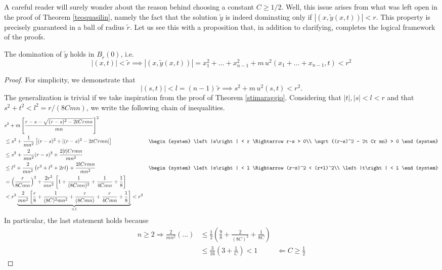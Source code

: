 A careful reader will surely wonder about the reason behind choosing a constant $C\geq 1/2$. Well, this issue arises from what was left open in the proof of Theorem \ref{teoquasilin}, namely the fact that the solution $\widetilde{y}$ is indeed dominating only if $|(x,\widetilde{y}(x,t))|< r$. This property is precisely guaranteed in a ball of radius $\widetilde{r}$. Let us see this with a proposition that, in addition to clarifying, completes the logical framework of the proofs.
\begin{namedtheorem}[Proposition]\label{prop}
The domination of $\widetilde{y}$ holds in $B_{\widetilde{r}}(0)$, i.e.
$$|(x,t)|<\widetilde{r} \implies |(x,\widetilde{y}(x,t))|=x_1^2 + \ldots + x_{n-1}^2 + m \, u^2(x_1 + \ldots + x_{n-1},t) < r^2$$
\end{namedtheorem}
\begin{proof}
For simplicity, we demonstrate that $$|(s,t)|< l=(n-1)\,\widetilde{r} \implies s^2 + m \, u^2(s,t) < r^2.$$ The generalization is trivial if we take inspiration from the proof of Theorem \ref{stimaraggio}. 
\newpage
Considering that $|t|,|s|<l<r$ and that $s^2+t^2<l^2=r/(8Cmn)$, we write the following chain of inequalities.
\begin{align*}
& s^2 + m \left[ \frac{r-s-\sqrt{(r-s)^2-2tCrmn}}{mn} \right]^2\\ 
&\leq s^2 + \frac{1}{mn^2} \left[ (r-s)^2 + |(r-s)^2-2tCrmn| \right] 
&\begin{system}
\left|s\right| < r \Rightarrow r-s > 0\\
 \sqrt{(r-s)^2 - 2t Cr mn} > 0 
\end{system}\\
&\leq s^2 + \frac{2}{mn^2} (r-s)^2 + \frac{2|t|Crmn}{mn^2} \\ 
&\leq l^2 + \frac{2}{mn^2} \left( r^2 + l^2 + 2rl \right) + \frac{2lCrmn}{mn^2} 
&\begin{system}
\left|s\right| < l \Rightarrow (r-s)^2 < (r+l)^2\\
\left|t\right| < l
\end{system}\\
&= \left( \frac{r}{8Cmn} \right)^2 + \frac{2r^2}{mn^2} \left[ 1+\frac{1}{(8Cmn)^2} + \frac{1}{4Cmn} + \frac{1}{8} \right] \\ 
&< r^2 \underbrace{\frac{2}{mn^2} \left[ \frac{r}{8} + \frac{1}{(8C)^2 mn^2} + \frac{r}{(8Cmn)} + \frac{r}{4Cmn} + \frac{1}{8} \right]}_{<1} < r^2 \\ 
\end{align*}
In particular, the last statement holds because
\begin{align*}
n \geq 2 \Rightarrow \frac{2}{mn^2} \left(\ldots\right) 
&\leq \frac{1}{2} \left(\frac{9}{8} + \frac{2}{(8C)^2} + \frac{1}{8C}\right) \\ 
& \leq \frac{3}{16} \left(3 + \frac{1}{C}\right) < 1 & \Leftarrow C \geq \frac{1}{2} 
\end{align*}
\end{proof}



